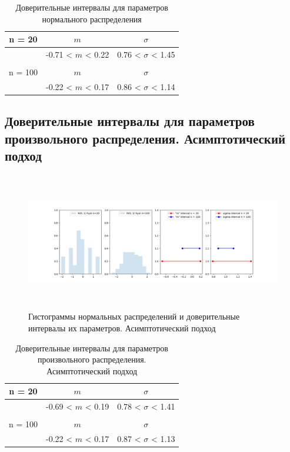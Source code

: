 \documentclass[a4paper,14pt]{article}
\begin{document}
	
	\begin{table}[H]
		\centering
		\begin{tabular}{| c | c | c |}
			\hline
			n = 20   &  $m$  & $\sigma$\\ \hline
			&  -0.71 < $m$ < 0.22 & 0.76 < $\sigma$ < 1.45 \\ \hline
			&   &   \\ \hline
			n = 100   &  $m$  & $\sigma$\\ \hline
			& -0.22 < $m$ < 0.17 & 0.86 < $\sigma$ < 1.14 \\
			\hline
		\end{tabular}
		\caption{Доверительные интервалы для параметров нормального распределения}
		\label{tab:interv_simple}
	\end{table}
	
	\subsection{Доверительные интервалы для параметров произвольного распределения. Асимптотический подход}
	\begin{figure}[H]
		\centering
		\includegraphics[width = 20cm, height = 6cm]{../image/lab8_2.png}
		\caption{Гистограммы нормальных распределений и доверительные интервалы их параметров. Асимптотический подход}
		\label{w_pert}
	\end{figure}
	
	\begin{table}[H]
		\centering
		\begin{tabular}{| c | c | c |}
			\hline
			n = 20   &  $m$  & $\sigma$\\ \hline
			&  -0.69 < $m$ < 0.19 & 0.78 < $\sigma$ < 1.41 \\ \hline
			&   &   \\ \hline
			n = 100   &  $m$  & $\sigma$\\ \hline
			& -0.22 < $m$ < 0.17 & 0.87 < $\sigma$ < 1.13 \\
			\hline
		\end{tabular}
		\caption{Доверительные интервалы для параметров произвольного распределения. Асимптотический подход}
		\label{tab:interv_asimpt}
	\end{table}
	
\end{document}
